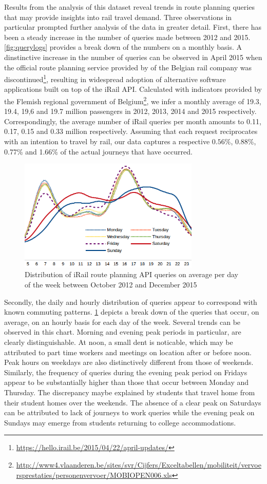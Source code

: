 \documentclass{sig-alternate}
\begin{document}
Results from the analysis of this dataset reveal trends in route planning queries that may provide insights into rail travel demand. 
Three observations in particular prompted further analysis of the data in greater detail. 
First, there has been a steady increase in the number of queries made between 2012 and 2015. 
\cref{fig:querylogs} provides a break down of the numbers on a monthly basis. 
A dinstinctive increase in the number of queries can be observed in April 2015 when the official route planning service provided by of the Belgian rail company was discontinued\footnote{\url{https://hello.irail.be/2015/04/22/april-updates/}}, resulting in widespread adoption of alternative software applications built on top of the iRail API.
Calculated with indicators provided by the Flemish regional government of Belgium\footnote{\url{http://www4.vlaanderen.be/sites/svr/Cijfers/Exceltabellen/mobiliteit/vervoersprestaties/personenvervoer/MOBIOPEN006.xls}}, we infer a monthly average of 19.3, 19.4, 19,6 and 19.7 million passengers in 2012, 2013, 2014 and 2015 respectively. 
Correspondingly, the average number of iRail queries per month amounts to 0.11, 0.17, 0.15 and 0.33 million respectively.
Assuming that each request reciprocates with an intention to travel by rail, our data captures a respective $0.56\%$, 0.88\%, 0.77\% and 1.66\% of the actual journeys that have occurred.

\begin{figure}
\centering
\includegraphics[width=8.6cm]{avg-all}
\caption{Distribution of iRail route planning API queries on average per day of the week between October 2012 and December 2015}
\label{fig:average}
\end{figure}

Secondly, the daily and hourly distribution of queries appear to correspond with known commuting patterns. 
\cref{fig:average} depicts a break down of the queries that occur, on average, on an hourly basis for each day of the week.
Several trends can be observed in this chart. 
Morning and evening peak periods in particular, are clearly distinguishable.
At noon, a small dent is noticable, which may be attributed to part time workers and meetings on location after or before noon.
Peak hours on weekdays are also distinctively different from those of weekends.
Similarly, the frequency of queries during the evening peak period on Fridays appear to be substantially higher than those that occur between Monday and Thursday.
The discrepancy maybe explained by students that travel home from their student homes over the weekends. 
The absence of a clear peak on Saturdays can be attributed to lack of journeys to work queries while the evening peak on Sundays may emerge from students returning to college accommodations.
\end{document}
